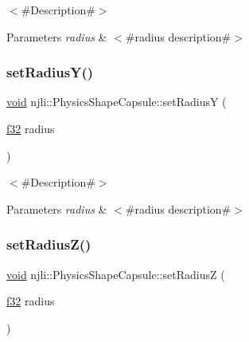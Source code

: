 $<$\#\+Description\#$>$


\begin{DoxyParams}{Parameters}
{\em radius} & $<$\#radius description\#$>$ \\
\hline
\end{DoxyParams}
\mbox{\label{classnjli_1_1_physics_shape_capsule_a5799e459af37db7465c58103738070a4}} 
\subsubsection{\texorpdfstring{set\+Radius\+Y()}{setRadiusY()}}
{\footnotesize\ttfamily \mbox{\hyperlink{_thread_8h_af1e856da2e658414cb2456cb6f7ebc66}{void}} njli\+::\+Physics\+Shape\+Capsule\+::set\+RadiusY (\begin{DoxyParamCaption}\item[{\mbox{\hyperlink{_util_8h_a5f6906312a689f27d70e9d086649d3fd}{f32}}}]{radius }\end{DoxyParamCaption})}

$<$\#\+Description\#$>$


\begin{DoxyParams}{Parameters}
{\em radius} & $<$\#radius description\#$>$ \\
\hline
\end{DoxyParams}
\mbox{\label{classnjli_1_1_physics_shape_capsule_a93ecc81a4a9f71c82e6968b10d7decf8}} 
\subsubsection{\texorpdfstring{set\+Radius\+Z()}{setRadiusZ()}}
{\footnotesize\ttfamily \mbox{\hyperlink{_thread_8h_af1e856da2e658414cb2456cb6f7ebc66}{void}} njli\+::\+Physics\+Shape\+Capsule\+::set\+RadiusZ (\begin{DoxyParamCaption}\item[{\mbox{\hyperlink{_util_8h_a5f6906312a689f27d70e9d086649d3fd}{f32}}}]{radius }\end{DoxyParamCaption})}

